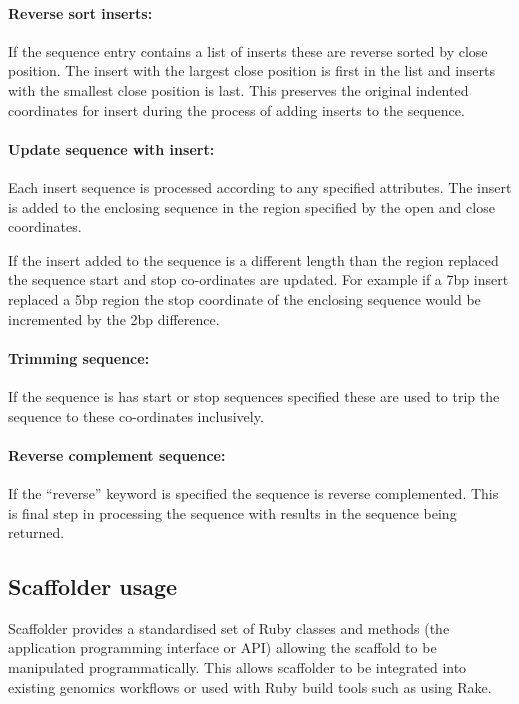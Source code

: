 \documentclass[10pt]{bmc_article}
\newenvironment{bmcformat}{\begin{raggedright}\baselineskip20pt\sloppy\setboolean{publ}{false}}{\end{raggedright}\baselineskip20pt\sloppy}
\begin{document}
\begin{bmcformat}
\paragraph{Reverse sort inserts:} If the sequence entry contains a list of
inserts these are reverse sorted by close position. The insert with the
largest close position is first in the list and inserts with the smallest
close position is last. This preserves the original indented coordinates for
insert during the process of adding inserts to the sequence. \pb

\paragraph{Update sequence with insert:} Each insert sequence is processed
according to any specified attributes. The insert is added to the enclosing
sequence in the region specified by the open and close coordinates. \pb

If the insert added to the sequence is a different length than the region
replaced the sequence start and stop co-ordinates are updated. For example if
a 7bp insert replaced a 5bp region the stop coordinate of the enclosing
sequence would be incremented by the 2bp difference. \pb

\paragraph{Trimming sequence:} If the sequence is has start or stop sequences
specified these are used to trip the sequence to these co-ordinates
inclusively. \pb 

\paragraph{Reverse complement sequence:} If the ``reverse'' keyword is
specified the sequence is reverse complemented. This is final step in
processing the sequence with results in the sequence being returned. \pb

\subsection*{Scaffolder usage} %

Scaffolder provides a standardised set of Ruby classes and methods (the
application programming interface or API) allowing the scaffold to be
manipulated programmatically. This allows scaffolder to be integrated into
existing genomics workflows or used with Ruby build tools such as using Rake.
\pb


\end{bmcformat}
\end{document}
